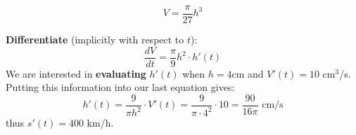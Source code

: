 \begin{frame}
\begin{example}
\[
V= \frac{\pi}{27} h^3
\] 

\textbf{Differentiate} (implicitly with respect to $ t $):\\
\[
 \frac{dV}{dt}=\frac{\pi}{9}  h^2 \cdot h'(t)
\]
\pause 
We are interested in \textbf{evaluating} $ h'(t) $ when  $h=4$cm and $V'(t) =
10$ cm$ ^3 $/s.  \pause 
Putting this information into our last equation gives:
\[
h'(t)= \frac{9}{\pi h^2}\cdot V'(t)= \frac{9}{\pi\cdot 4^2}\cdot 10= \frac{90}{16\pi}\text{ cm/s} 
\]
thus $s'(t)=400$ km/h.

\end{example}
\end{frame}

